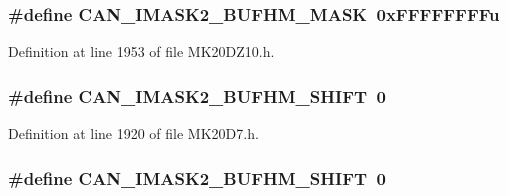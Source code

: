 \subsubsection[{\texorpdfstring{C\+A\+N\+\_\+\+I\+M\+A\+S\+K2\+\_\+\+B\+U\+F\+H\+M\+\_\+\+M\+A\+SK}{CAN_IMASK2_BUFHM_MASK}}]{\setlength{\rightskip}{0pt plus 5cm}\#define C\+A\+N\+\_\+\+I\+M\+A\+S\+K2\+\_\+\+B\+U\+F\+H\+M\+\_\+\+M\+A\+SK~0x\+F\+F\+F\+F\+F\+F\+F\+Fu}\hypertarget{group___c_a_n___register___masks_ga9a609dcb1bca8001d83d0c6e4606a454}{}\label{group___c_a_n___register___masks_ga9a609dcb1bca8001d83d0c6e4606a454}


Definition at line 1953 of file M\+K20\+D\+Z10.\+h.

\subsubsection[{\texorpdfstring{C\+A\+N\+\_\+\+I\+M\+A\+S\+K2\+\_\+\+B\+U\+F\+H\+M\+\_\+\+S\+H\+I\+FT}{CAN_IMASK2_BUFHM_SHIFT}}]{\setlength{\rightskip}{0pt plus 5cm}\#define C\+A\+N\+\_\+\+I\+M\+A\+S\+K2\+\_\+\+B\+U\+F\+H\+M\+\_\+\+S\+H\+I\+FT~0}\hypertarget{group___c_a_n___register___masks_ga0d2a12288f44224a38a4d784903838bb}{}\label{group___c_a_n___register___masks_ga0d2a12288f44224a38a4d784903838bb}


Definition at line 1920 of file M\+K20\+D7.\+h.

\subsubsection[{\texorpdfstring{C\+A\+N\+\_\+\+I\+M\+A\+S\+K2\+\_\+\+B\+U\+F\+H\+M\+\_\+\+S\+H\+I\+FT}{CAN_IMASK2_BUFHM_SHIFT}}]{\setlength{\rightskip}{0pt plus 5cm}\#define C\+A\+N\+\_\+\+I\+M\+A\+S\+K2\+\_\+\+B\+U\+F\+H\+M\+\_\+\+S\+H\+I\+FT~0}\hypertarget{group___c_a_n___register___masks_ga0d2a12288f44224a38a4d784903838bb}{}\label{group___c_a_n___register___masks_ga0d2a12288f44224a38a4d784903838bb}



